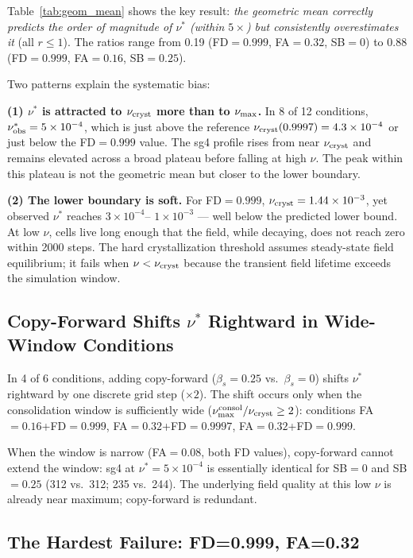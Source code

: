 \documentclass[11pt]{article}
\begin{document}
Table~\ref{tab:geom_mean} shows the key result: \emph{the geometric mean
correctly predicts the order of magnitude of $\nu^*$ (within $5\times$) but
consistently overestimates it} (all $r \leq 1$). The ratios range from 0.19
(FD$=0.999$, FA$=0.32$, SB$=0$) to 0.88 (FD$=0.999$, FA$=0.16$, SB$=0.25$).

Two patterns explain the systematic bias:

\textbf{(1) $\nu^*$ is attracted to $\nu_{\rm cryst}$ more than to $\nu_{\rm
max}$.} In 8 of 12 conditions, $\nu^*_{\rm obs} = 5\times10^{-4}$, which is
just above the reference $\nu_{\rm cryst}(0.9997) = 4.3\times10^{-4}$ or just
below the FD$=0.999$ value. The sg4 profile rises from near $\nu_{\rm cryst}$
and remains elevated across a broad plateau before falling at high $\nu$.
The peak within this plateau is not the geometric mean but closer to the
lower boundary.

\textbf{(2) The lower boundary is soft.} For FD$=0.999$, $\nu_{\rm cryst}
= 1.44\times10^{-3}$, yet observed $\nu^*$ reaches $3\times10^{-4}$--
$1\times10^{-3}$ --- well below the predicted lower bound. At low $\nu$, cells
live long enough that the field, while decaying, does not reach zero within
2000 steps. The hard crystallization threshold assumes steady-state field
equilibrium; it fails when $\nu < \nu_{\rm cryst}$ because the transient
field lifetime exceeds the simulation window.

\subsection{Copy-Forward Shifts $\nu^*$ Rightward in Wide-Window Conditions}

In 4 of 6 conditions, adding copy-forward ($\beta_s=0.25$ vs.\ $\beta_s=0$)
shifts $\nu^*$ rightward by one discrete grid step ($\times 2$). The shift
occurs only when the consolidation window is sufficiently wide
($\nu_{\rm max}^{\rm consol} / \nu_{\rm cryst} \geq 2$): conditions
FA$=0.16$+FD$=0.999$, FA$=0.32$+FD$=0.9997$, FA$=0.32$+FD$=0.999$.

When the window is narrow (FA$=0.08$, both FD values), copy-forward cannot
extend the window: sg4 at $\nu^* = 5\times10^{-4}$ is essentially identical
for SB$=0$ and SB$=0.25$ (312 vs.\ 312; 235 vs.\ 244). The underlying field
quality at this low $\nu$ is already near maximum; copy-forward is redundant.

\subsection{The Hardest Failure: FD=0.999, FA=0.32}
\end{document}

